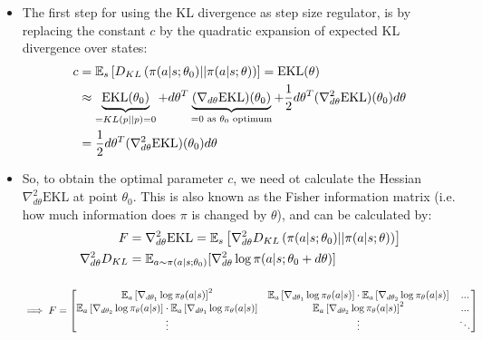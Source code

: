 \begin{itemize}
	\item The first step for using the KL divergence as step size regulator, is by replacing the constant $c$ by the quadratic expansion of expected KL divergence over states:
	\begin{equation*}
		\begin{split}
			c & = \mathbb{E}_{s}\left[D_{KL}\left(\pi(a|s;\theta_0)||\pi(a|s;\theta)\right)\right] = \text{EKL}(\theta)\\
			& \approx \underbrace{\text{EKL}(\theta_0)}_{=KL(p||p)=0} + d\theta^T \underbrace{(\nabla_{d\theta}\text{EKL})(\theta_0)}_{=0 \text{ as }\theta_0\text{ optimum}} + \frac{1}{2}d\theta^T (\nabla_{d\theta}^2\text{EKL})(\theta_0)d\theta\\
			& = \frac{1}{2}d\theta^T (\nabla_{d\theta}^2\text{EKL})(\theta_0)d\theta\\
		\end{split}
	\end{equation*}
	\item So, to obtain the optimal parameter $c$, we need ot calculate the Hessian $\nabla_{d\theta}^2\text{EKL}$ at point $\theta_0$. This is also known as the Fisher information matrix (i.e. how much information does $\pi$ is changed by $\theta$), and can be calculated by:
	\begin{equation*}
		\begin{split}
			F & = \nabla_{d\theta}^2\text{EKL} = \mathbb{E}_{s}\left[\nabla_{d\theta}^2 D_{KL}\left(\pi(a|s;\theta_0)||\pi(a|s;\theta)\right)\right]\\
			\nabla_{d\theta}^2 D_{KL} & = \mathbb{E}_{a\sim\pi(a|s;\theta_0)}[\nabla_{d\theta}^2 \log \pi(a|s;\theta_0+d\theta)]\\[10pt]
		\end{split}
	\end{equation*}
	$$\implies F = \begin{bmatrix}
	\mathbb{E}_a\left[\nabla_{d\theta_1} \log \pi_{\theta}(a|s)\right]^2 & \mathbb{E}_a\left[\nabla_{d\theta_1} \log \pi_{\theta}(a|s)\right]\cdot \mathbb{E}_a\left[\nabla_{d\theta_2} \log \pi_{\theta}(a|s)\right] & ...\\
	\mathbb{E}_a\left[\nabla_{d\theta_2} \log \pi_{\theta}(a|s)\right]\cdot \mathbb{E}_a\left[\nabla_{d\theta_1} \log \pi_{\theta}(a|s)\right] & \mathbb{E}_a\left[\nabla_{d\theta_2} \log \pi_{\theta}(a|s)\right]^2 & ...\\
	\vdots & \vdots & \ddots
	\end{bmatrix}$$
	

\end{itemize}
